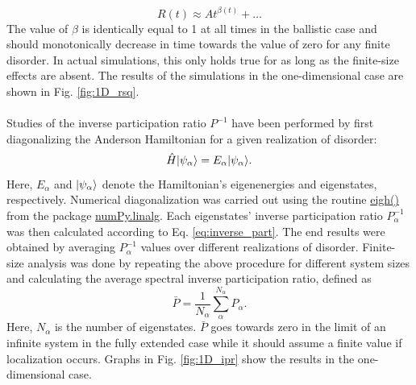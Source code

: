 \documentclass[10pt,a4paper]{article}
\begin{document}
\begin{equation}\label{eq:beta}
R(t)\approx At^{\beta(t)}+\dots
\end{equation}
The value of $\beta$ is identically equal to 1 at all times in the ballistic case and should monotonically decrease in time towards the value of zero for any finite disorder. In actual simulations, this only holds true for as long as the finite-size effects are absent. The results of the simulations in the one-dimensional case are shown in Fig. \ref{fig:1D_rsq}.\\\\
\noindent
Studies of the inverse participation ratio $P^{-1}$ have been performed by first diagonalizing the Anderson Hamiltonian for a given realization of disorder:
\begin{equation}
\hat{H}\vert\psi_\alpha\rangle = E_\alpha\vert\psi_\alpha\rangle.
\end{equation}
Here, $E_\alpha$ and $\vert\psi_\alpha\rangle$ denote the Hamiltonian's eigenenergies and eigenstates, respectively. Numerical diagonalization was carried out using the routine \url{eigh()} from the package \url{numPy.linalg}. Each eigenstates' inverse participation ratio $P^{-1}_{\alpha}$ was then calculated according to Eq. \eqref{eq:inverse_part}. The end results were obtained by averaging $P^{-1}_{\alpha}$ values over different realizations of disorder. Finite-size analysis was done by repeating the above procedure for different system sizes and calculating the average spectral inverse participation ratio, defined as 
\begin{equation}\label{eq:P_ave}
\bar{P}=\frac{1}{N_\alpha}\sum\limits_\alpha^{N_\alpha} P_\alpha.
\end{equation}
Here, $N_\alpha$ is the number of eigenstates. $\bar{P}$ goes towards zero in the limit of an infinite system in the fully extended case while it should assume a finite value if localization occurs. Graphs in Fig. \ref{fig:1D_ipr} show the results in the one-dimensional case.
\end{document}
